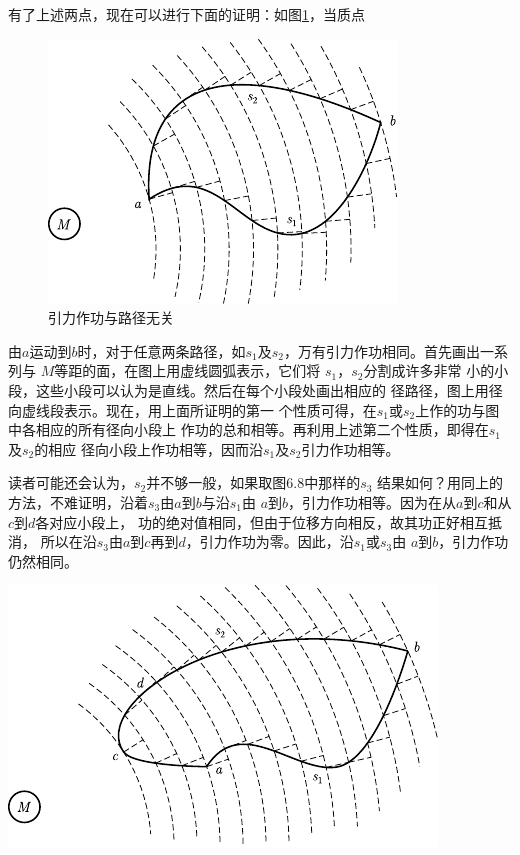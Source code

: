 有了上述两点，现在可以进行下面的证明：如图\ref{fig:06.07}，当质点
\begin{figure}
    \vspace{-1.3em}
    \centering
    \includegraphics{figure/fig06.07}
    \caption{引力作功与路径无关}
    \label{fig:06.07}
\end{figure}
由$ a $运动到$ b $时，对于任意两条路径，如$ s _ { 1 } $及$
s _ { 2 } $，万有引力作功相同。首先画出一系列与
$ M $等距的面，在图上用虚线圆弧表示，它们将
$ s _ { 1 } $，$ s _ { 2 } $分割成许多非常
小的小段，这些小段可以认为是直线。然后在每个小段处画出相应的
径路径，图上用径向虚线段表示。现在，用上面所证明的第一
个性质可得，在$ s _ { 1 } $或$ s _ { 2 } $上作的功与图中各相应的所有径向小段上
作功的总和相等。再利用上述第二个性质，即得在$ s _ { 1 } $ 及$ s _ { 2 } $的相应
径向小段上作功相等，因而沿$ s _ { 1 } $及$ s _ { 2 } $引力作功相等。

读者可能还会认为，$ s _ { 2 } $并不够一般，如果取图6.8中那样的$ s _ { 3 } $
结果如何？用同上的方法，不难证明，沿着$ s _ { 3 } $由$ a $到$ b $与沿$ s _ { 1 } $由
$ a $到$ b $，引力作功相等。因为在从$ a $到$ c $和从$ c $到$ d $各对应小段上，
功的绝对值相同，但由于位移方向相反，故其功正好相互抵消，
所以在沿$ s _ { 3 } $由$ a $到$ c $再到$ d $，引力作功为零。因此，沿$ s _ { 1 } $或$ s _ { 3 } $由
$ a $到$ b $，引力作功仍然相同。

\begin{figurex}
    \centering
    \includegraphics{figure/fig06.08}
    \caption{引力作功与路径无关}
    \label{fig:06.08}
\end{figurex}

